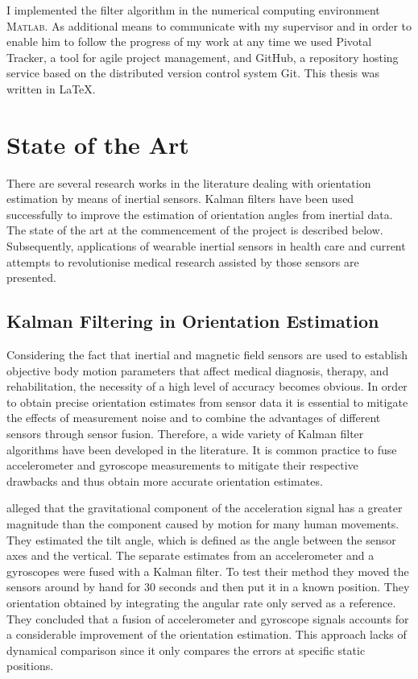 I implemented the filter algorithm in the numerical computing environment \textsc{Matlab}\textsuperscript{\textregistered}. As additional means to communicate with my supervisor and in order to enable him to follow the progress of my work at any time we used Pivotal Tracker, a tool for agile project management, and GitHub, a repository hosting service based on the distributed version control system Git. This thesis was written in \LaTeX{}.
 
\section{State of the Art}\label{sec:state_of_the_art}

There are several research works in the literature dealing with orientation estimation by means of inertial sensors. Kalman filters have been used successfully to improve the estimation of orientation angles from inertial data. The state of the art at the commencement of the project is described below. Subsequently, applications of wearable inertial sensors in health care and current attempts to revolutionise medical research assisted by those sensors are presented.

\subsection{Kalman Filtering in Orientation Estimation}

Considering the fact that inertial and magnetic field sensors are used to establish objective body motion parameters that affect medical diagnosis, therapy, and rehabilitation, the necessity of a high level of accuracy becomes obvious. In order to obtain precise orientation estimates from sensor data it is essential to mitigate the effects of measurement noise and to combine the advantages of different  sensors through sensor fusion. Therefore, a wide variety of Kalman filter algorithms have been developed in the literature. It is common practice to fuse accelerometer and gyroscope measurements to mitigate their respective drawbacks and thus obtain more accurate orientation estimates.

\citeauthor{Luinge_orientation_acc_gyro_99} \cite{Luinge_orientation_acc_gyro_99} alleged that the gravitational component of the acceleration signal has a greater magnitude than the component caused by motion for many human movements. They estimated the tilt angle, which is defined as the angle between the sensor axes and the vertical. The separate estimates from an accelerometer and a gyroscopes were fused with a Kalman filter. To test their method they moved the sensors around by hand for 30 seconds and then put it in a known position. They orientation obtained by integrating the angular rate only served as a reference. They concluded that a fusion of accelerometer and gyroscope signals accounts for a considerable improvement of the orientation estimation. This approach lacks of dynamical comparison since it only compares the errors at specific static positions.

